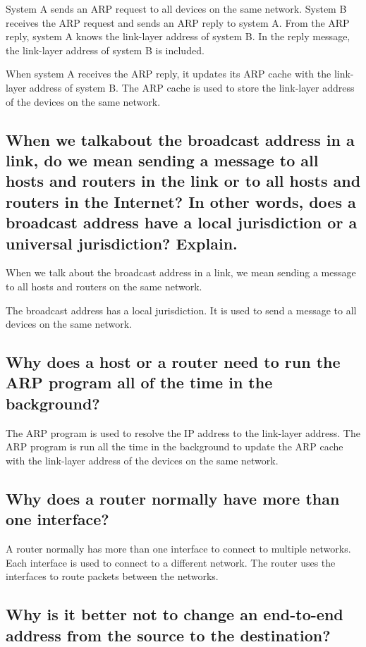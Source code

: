 \documentclass{article}
\begin{document}
System A sends an ARP request to all devices on the same network. System B receives the ARP request and sends an ARP reply to system A. From the ARP reply, system A knows the link-layer address of system B. In the reply message, the link-layer address of system B is included.

When system A receives the ARP reply, it updates its ARP cache with the link-layer address of system B. The ARP cache is used to store the link-layer address of the devices on the same network.

\subsection{
	When we talkabout the broadcast address in a link, do we mean sending a
	message to all hosts and routers in the link or to all hosts and routers in the
	Internet? In other words, does a broadcast address have a local jurisdiction or
	a universal jurisdiction? Explain.
}

When we talk about the broadcast address in a link, we mean sending a message to all hosts and routers on the same network.

The broadcast address has a local jurisdiction. It is used to send a message to all devices on the same network.

\subsection{
	Why does a host or a router need to run the ARP program all of the time in the
	background?
}

The ARP program is used to resolve the IP address to the link-layer address. The ARP program is run all the time in the background to update the ARP cache with the link-layer address of the devices on the same network.

\subsection{
	Why does a router normally have more than one interface?
}

A router normally has more than one interface to connect to multiple networks. Each interface is used to connect to a different network. The router uses the interfaces to route packets between the networks.

\subsection{
	Why is it better not to change an end-to-end address from the source to the
	destination?
}
\end{document}
